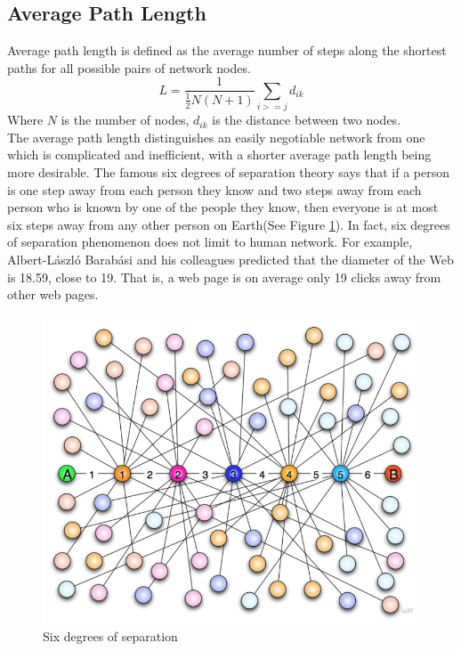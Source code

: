 \subsection{Average Path Length}
Average path length is defined as the average number of steps along the shortest paths for all possible pairs of network nodes\cite{www-apl}. 
\\
\begin{equation}
L=\frac{1}{\frac{1}{2}N(N+1)}\sum_{i>=j}d_{ik}
\end{equation}
Where $N$ is the number of nodes, $d_{ik}$ is the distance between two nodes.
\\
The average path length distinguishes an easily negotiable network from one which is complicated and inefficient, with a shorter average path length being more desirable. The famous six degrees of separation theory\cite{www-sds} says that if a person is one step away from each person they know and two steps away from each person who is known by one of the people they know, then everyone is at most six steps away from any other person on Earth(See Figure \ref{F:six}). In fact, six degrees of separation phenomenon does not limit to human network. For example, Albert-L\'{a}szl\'{o} Barab\'{a}si and his colleagues predicted that the diameter of the Web is 18.59, close to 19. That is, a web page is on average only 19 clicks away from other web pages.


\begin{figure}[ht!]
\includegraphics [totalheight=0.3\textheight]{images/six.png}
\caption {Six degrees of separation\cite{www-sds}}
\label {F:six}
\end{figure}



